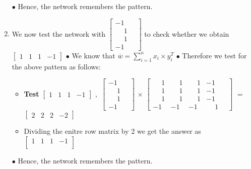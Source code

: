 \documentclass[12pt]{article}
\begin{document}
\begin{enumerate}[label=\textbf{\alph* .}]
	$\bullet$ Hence, the network remembers the pattern.
	\BlankLine
	\BlankLine
	
	\item We now test the network with $\begin{bmatrix}
		-1\quad  \\
		\phantom{-}1\quad \\
		\phantom{-}1\quad  \\
		-1\quad
	\end{bmatrix}$ to check whether we obtain 	$\begin{bmatrix}
		1 & 1 & 1 & -1
	\end{bmatrix}$
	\BlankLine
	$\bullet$ We know that $\overline{w} = \displaystyle \sum_{i = 1 }^{n} x_i \times y_{i}^{T}$
	\BlankLine
	$\bullet$ Therefore we test for the above pattern as follows:
	\BlankLine
	\BlankLine 
	
		\begin{itemize}[label=$\rightarrow$]
		
		\item \textbf{Test} $\begin{bmatrix}
			1 & 1 & 1 & -1
		\end{bmatrix}$ $,$ \quad\qquad $\begin{bmatrix}
			-1\quad  \\
			\phantom{-}1\quad \\
			\phantom{-}1\quad  \\
			-1\quad
		\end{bmatrix}$
		$\times$
		$\begin{bmatrix}
			\phantom{-}1 & 	\phantom{-}1 & 	\phantom{-}1 & -1 \quad\\
			\phantom{-}1 & 	\phantom{-}1 &	\phantom{-} 1 & -1 \quad \\
			\phantom{-}	1 & \phantom{-}1 &	\phantom{-} 1 & -1 \quad\\
			-1 & -1 & -1 & 	\phantom{-}1 \quad
		\end{bmatrix}$ $=$ $\begin{bmatrix}
			2 & 2 & 2 & -2
		\end{bmatrix}$ 
		
		\item Dividing the enitre row matrix by 2 we get the answer as $\begin{bmatrix}
			1 & 1 & 1 & -1\\
		\end{bmatrix}$ 
	\end{itemize}
	
	$\bullet$ Hence, the network remembers the pattern.
	\BlankLine
	
	
	
\end{enumerate}
\end{document}
